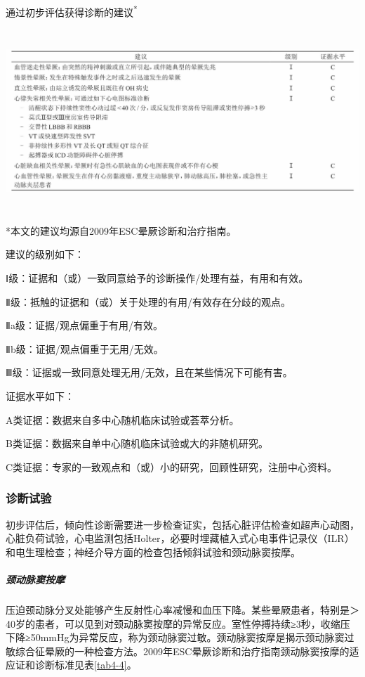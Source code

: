 \begin{table}[htbp]
\centering
\caption{通过初步评估获得诊断的建议\textsuperscript{*}}
\label{tab4-3}
\includegraphics[width=6.66667in,height=2.69792in]{./images/Image00020.jpg}
\end{table}

*本文的建议均源自2009年ESC晕厥诊断和治疗指南。

建议的级别如下：

Ⅰ级：证据和（或）一致同意给予的诊断操作/处理有益，有用和有效。

Ⅱ级：抵触的证据和（或）关于处理的有用/有效存在分歧的观点。

Ⅱa级：证据/观点偏重于有用/有效。

Ⅱb级：证据/观点偏重于无用/无效。

Ⅲ级：证据或一致同意处理无用/无效，且在某些情况下可能有害。

证据水平如下：

A类证据：数据来自多中心随机临床试验或荟萃分析。

B类证据：数据来自单中心随机临床试验或大的非随机研究。

C类证据：专家的一致观点和（或）小的研究，回顾性研究，注册中心资料。

\subsubsection{诊断试验}

初步评估后，倾向性诊断需要进一步检查证实，包括心脏评估检查如超声心动图，心脏负荷试验，心电监测包括Holter，必要时埋藏植入式心电事件记录仪（ILR）和电生理检查；神经介导方面的检查包括倾斜试验和颈动脉窦按摩。

\subparagraph{颈动脉窦按摩}

压迫颈动脉分叉处能够产生反射性心率减慢和血压下降。某些晕厥患者，特别是＞
40岁的患者，可以见到对颈动脉窦按摩的异常反应。室性停搏持续≥3秒，收缩压下降≥50mmHg为异常反应，称为颈动脉窦过敏。颈动脉窦按摩是揭示颈动脉窦过敏综合征晕厥的一种检查方法。2009年ESC晕厥诊断和治疗指南颈动脉窦按摩的适应证和诊断标准见表\ref{tab4-4}。

